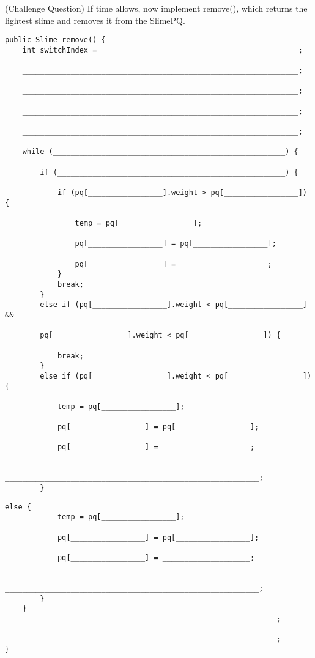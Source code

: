 \begin{blocksection}
\question (Challenge Question) If time allows, now implement remove(), which returns the lightest slime and removes it from the SlimePQ. 
\begin{lstlisting}
public Slime remove() {
    int switchIndex = _____________________________________________;
    
    _______________________________________________________________;
    
    _______________________________________________________________;
    
    _______________________________________________________________;
    
    _______________________________________________________________;
    
    while (_____________________________________________________) {
    
        if (____________________________________________________) {
        
            if (pq[_________________].weight > pq[_________________]) {
            
                temp = pq[_________________];
                
                pq[_________________] = pq[_________________];
                
                pq[_________________] = ____________________;
            }
            break;
        }
        else if (pq[_________________].weight < pq[_________________] &&
        
        pq[_________________].weight < pq[_________________]) {
        
            break;
        }
        else if (pq[_________________].weight < pq[_________________]) {
        
            temp = pq[_________________];
            
            pq[_________________] = pq[_________________];
            
            pq[_________________] = ____________________;
            
            __________________________________________________________;
        } 
\end{lstlisting}
\end{blocksection}
\begin{blocksection}
\begin{lstlisting}
else {
            temp = pq[_________________];
            
            pq[_________________] = pq[_________________];
            
            pq[_________________] = ____________________;
            
            __________________________________________________________;
        }
    }
    __________________________________________________________;
    
    __________________________________________________________;
}
\end{lstlisting}

\end{blocksection}
